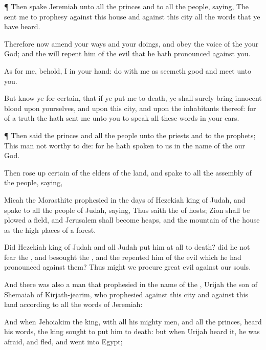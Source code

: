 {\par }{\PP {}¶ Then
spake
Jeremiah unto all the
princes and to all the
people,
saying, The
{}
sent me to
prophesy against this
house and against this
city all the
words that ye have
heard.

Therefore now
amend your
ways and your
doings, and
obey the
voice of the
{} your
God; and the
{} will
repent him of the
evil that he hath
pronounced against you.

As for me, behold, I
{} in your
hand:
do with me as
seemeth
good and
meet unto you.

But
know ye for
certain, that if ye put me to
death, ye shall surely
bring
innocent
blood upon yourselves, and upon this
city, and upon the
inhabitants thereof: for of a
truth the
{} hath
sent me unto you to
speak all these
words in your
ears.


\par }{\PP {}¶ Then
said the
princes and all the
people unto the
priests and to the
prophets; This
man
{} not
worthy to
die: for he hath
spoken to us in the
name of the
{} our
God.

Then rose
up
certain of the
elders of the
land, and
spake to all the
assembly of the
people,
saying,

Micah the
Morasthite
prophesied in the
days of
Hezekiah
king of
Judah, and
spake to all the
people of
Judah,
saying, Thus
saith the
{} of
hosts;
Zion shall be
plowed
{} a
field, and
Jerusalem shall become
heaps, and the
mountain of the
house as the high
places of a
forest.

Did
Hezekiah
king of
Judah and all
Judah put him at
all to
death? did he not
fear the
{}, and
besought the
{}, and the
{}
repented him of the
evil which he had
pronounced against them?
Thus might we
procure
great
evil against our
souls.

And there was also a
man that
prophesied in the
name of the
{},
Urijah the
son of
Shemaiah of
Kirjath-jearim, who
prophesied against this
city and against this
land according to all the
words of
Jeremiah:

And when
Jehoiakim the
king, with all his mighty
men, and all the
princes,
heard his
words, the
king
sought to put him to
death: but when
Urijah
heard it, he was
afraid, and
fled, and
went into
Egypt;

}
